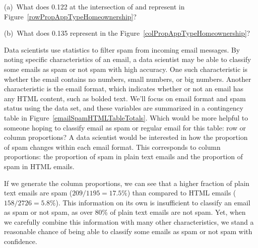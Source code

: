 \begin{exercisewrap}
\begin{nexercise}
(a)~What does 0.122 at the intersection of  and
 represent in
Figure~\ref{rowPropAppTypeHomeownership}?

(b)~What does 0.135 represent in the
Figure~\ref{colPropAppTypeHomeownership}?\footnotemark{}
\end{nexercise}
\end{exercisewrap}

\begin{examplewrap}
\begin{nexample}{
    Data scientists use statistics to filter spam from incoming
    email messages.
    By noting specific characteristics of an email,
    a data scientist may be able to classify some emails as spam
    or not spam with high accuracy.
    One such characteristic is whether the email
    contains no numbers, small numbers, or big numbers.
    Another characteristic is the email format, which
    indicates whether or not an email has any HTML content,
    such as bolded text.
    We'll focus on email format and spam status using the
     data set, and these variables are summarized
    in a contingency table in
    Figure~\ref{emailSpamHTMLTableTotals}.
    Which would be more helpful to someone hoping to classify
    email as spam or regular email for this table:
    row or column proportions?}
  \label{weighingRowColumnProportions}
  A data scientist would be interested in how the proportion
  of spam changes within each email format.
  This corresponds to column proportions:
  the proportion of spam in plain text emails
  and the proportion of spam in HTML emails.

  If we generate the column proportions, we can see
  that a higher fraction of plain text emails are
  spam ($209/1195 = 17.5\%$)
  than compared to HTML emails ($158/2726 = 5.8\%$).
  This information on its own is insufficient to classify
  an email as spam or not spam, as over 80\% of plain text
  emails are not spam.
  Yet, when we carefully combine this information with many
  other characteristics,
  we stand a reasonable chance of being able to classify
  some emails as spam or not spam with confidence.
\end{nexample}
\end{examplewrap}

